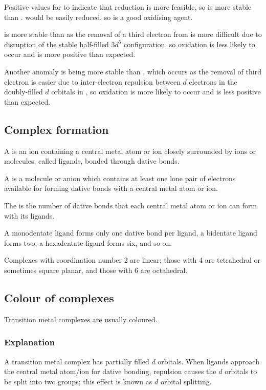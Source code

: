 \documentclass[Chemistry.tex]{subfiles}
\begin{document}
Positive \slEo{} values for  to  indicate that reduction is more feasible, so  is more stable than .  would be easily reduced, so  is a good oxidising agent.

 is more stable than  as the removal of a third electron from  is more difficult due to disruption of the stable half-filled \(3d^5\) configuration, so oxidation is less likely to occur and \slEo{} is more positive than expected.

Another anomaly is  being more stable than , which occurs as the removal of third electron is easier due to inter-electron repulsion between \(d\) electrons in the doubly-filled \(d\) orbitals in , so oxidation is more likely to occur and \slEo{} is less positive than expected.
\subsection{Complex formation}
A  is an ion containing a central metal atom or ion closely surrounded by ions or molecules, called ligands, bonded through dative bonds.

A  is a molecule or anion which contains at least one lone pair of electrons available for forming dative bonds with a central metal atom or ion.

The  is the number of dative bonds that each central metal atom or ion can form with its ligands.

A monodentate ligand forms only one dative bond per ligand, a bidentate ligand forms two, a hexadentate ligand forms six, and so on.

Complexes with coordination number 2 are linear; those with 4 are tetrahedral or sometimes square planar, and those with 6 are octahedral.
\subsection{Colour of complexes}
Transition metal complexes are usually coloured.
\subsubsection{Explanation}
A transition metal complex has partially filled \(d\) orbitals. When ligands approach the central metal atom\slash ion for dative bonding, repulsion causes the \(d\) orbitals to be split into two groups; this effect is known as \(d\) orbital splitting.
\end{document}
